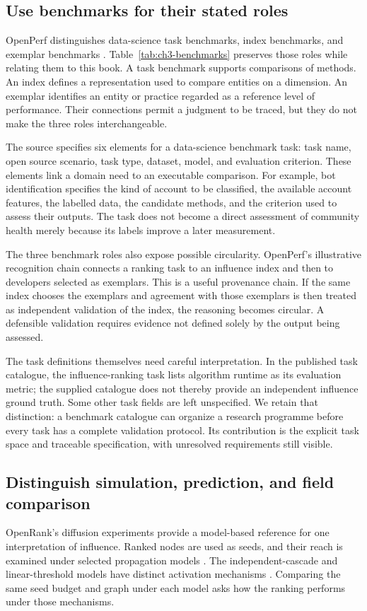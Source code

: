 \subsection{Use benchmarks for their stated roles}
OpenPerf distinguishes data-science task benchmarks, index benchmarks, and exemplar benchmarks \citep[Section 3]{han2025openperf}. Table~\ref{tab:ch3-benchmarks} preserves those roles while relating them to this book. A task benchmark supports comparisons of methods. An index defines a representation used to compare entities on a dimension. An exemplar identifies an entity or practice regarded as a reference level of performance. Their connections permit a judgment to be traced, but they do not make the three roles interchangeable.



The source specifies six elements for a data-science benchmark task: task name, open source scenario, task type, dataset, model, and evaluation criterion. These elements link a domain need to an executable comparison. For example, bot identification specifies the kind of account to be classified, the available account features, the labelled data, the candidate methods, and the criterion used to assess their outputs. The task does not become a direct assessment of community health merely because its labels improve a later measurement.

The three benchmark roles also expose possible circularity. OpenPerf's illustrative recognition chain connects a ranking task to an influence index and then to developers selected as exemplars. This is a useful provenance chain. If the same index chooses the exemplars and agreement with those exemplars is then treated as independent validation of the index, the reasoning becomes circular. A defensible validation requires evidence not defined solely by the output being assessed.

The task definitions themselves need careful interpretation. In the published task catalogue, the influence-ranking task lists algorithm runtime as its evaluation metric; the supplied catalogue does not thereby provide an independent influence ground truth. Some other task fields are left unspecified. We retain that distinction: a benchmark catalogue can organize a research programme before every task has a complete validation protocol. Its contribution is the explicit task space and traceable specification, with unresolved requirements still visible.

\subsection{Distinguish simulation, prediction, and field comparison}
OpenRank's diffusion experiments provide a model-based reference for one interpretation of influence. Ranked nodes are used as seeds, and their reach is examined under selected propagation models \citep{han2026rank}. The independent-cascade and linear-threshold models have distinct activation mechanisms \citep{kempe2003}. Comparing the same seed budget and graph under each model asks how the ranking performs under those mechanisms.

